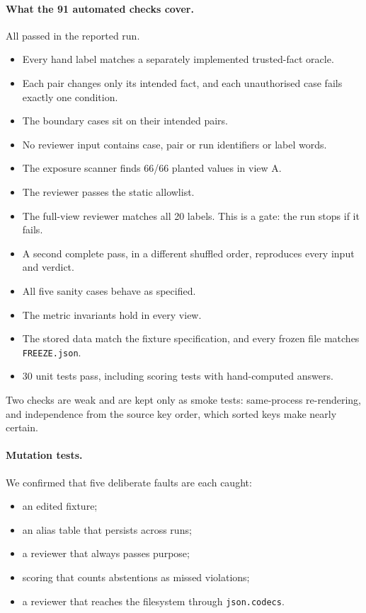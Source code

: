 \documentclass[11pt]{article}
\newcommand{\code}[1]{\texttt{#1}}
\begin{document}
\paragraph{What the 91 automated checks cover.} All passed in the reported run.
\begin{itemize}
  \item Every hand label matches a separately implemented trusted-fact oracle.
  \item Each pair changes only its intended fact, and each unauthorised case fails exactly one condition.
  \item The boundary cases sit on their intended pairs.
  \item No reviewer input contains case, pair or run identifiers or label words.
  \item The exposure scanner finds 66/66 planted values in view A.
  \item The reviewer passes the static allowlist.
  \item The full-view reviewer matches all 20 labels. This is a gate: the run stops if it fails.
  \item A second complete pass, in a different shuffled order, reproduces every input and verdict.
  \item All five sanity cases behave as specified.
  \item The metric invariants hold in every view.
  \item The stored data match the fixture specification, and every frozen file matches \code{FREEZE.json}.
  \item 30 unit tests pass, including scoring tests with hand-computed answers.
\end{itemize}
Two checks are weak and are kept only as smoke tests: same-process re-rendering, and independence from the source key order, which sorted keys make nearly certain.

\paragraph{Mutation tests.} We confirmed that five deliberate faults are each caught:
\begin{itemize}
  \item an edited fixture;
  \item an alias table that persists across runs;
  \item a reviewer that always passes purpose;
  \item scoring that counts abstentions as missed violations;
  \item a reviewer that reaches the filesystem through \code{json.codecs}.
\end{itemize}
\end{document}
